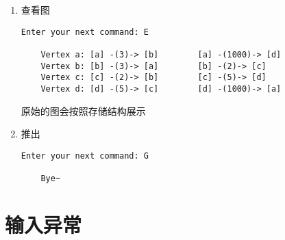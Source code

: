 \begin{enumerate}
    \item 查看图
\begin{lstlisting}[style=console]
    Enter your next command: E

    Vertex a: [a] -(3)-> [b]		[a] -(1000)-> [d]		
    Vertex b: [b] -(3)-> [a]		[b] -(2)-> [c]		
    Vertex c: [c] -(2)-> [b]		[c] -(5)-> [d]		
    Vertex d: [d] -(5)-> [c]		[d] -(1000)-> [a]		
\end{lstlisting}
    原始的图会按照存储结构展示

    \item 推出
\begin{lstlisting}[style=console]
    Enter your next command: G

    Bye~
\end{lstlisting}

    
\end{enumerate}


\section{输入异常}

